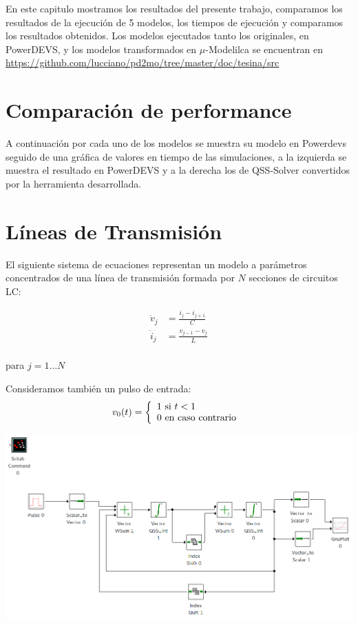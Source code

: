 	En este capitulo mostramos los resultados del presente trabajo, comparamos los resultados de la ejecución de 5 modelos, los tiempos de ejecución y 
		comparamos los resultados obtenidos. Los modelos ejecutados tanto los originales, en PowerDEVS, y los modelos transformados en 
		$\mu$-Modelilca se encuentran en \url{https://github.com/lucciano/pd2mo/tree/master/doc/tesina/src}


\section{Comparación de performance}
	A continuación por cada uno de los modelos se muestra su modelo en Powerdevs seguido de una gráfica de valores en tiempo de las simulaciones, 
	a la izquierda se muestra el resultado en PowerDEVS y a la derecha los de QSS-Solver convertidos por la herramienta desarrollada.

\section{Líneas de Transmisión}
	El siguiente sistema de ecuaciones representan un modelo a parámetros concentrados de una línea de transmisión formada por $N$ secciones de circuitos LC:

\begin{equation*}
\begin{split}
\dot{v}_{j} &= \frac{i_{j} - i_{j+1}}{C} \\
\dot{i}_{j} &= \frac{v_{j-1} - v_{j}}{L} \\	
\end{split}
\end{equation*}

para $j = 1 \dots N$

Consideramos también un pulso de entrada:
\begin{equation}
v_0(t) = \left\{ 
  \begin{array}{l l}
    1 \text{ si } t < 1 \\
    0 \text{ en caso contrario }
  \end{array} \right.
\end{equation}

 \includegraphics[width=0.75\linewidth]{lclines}

